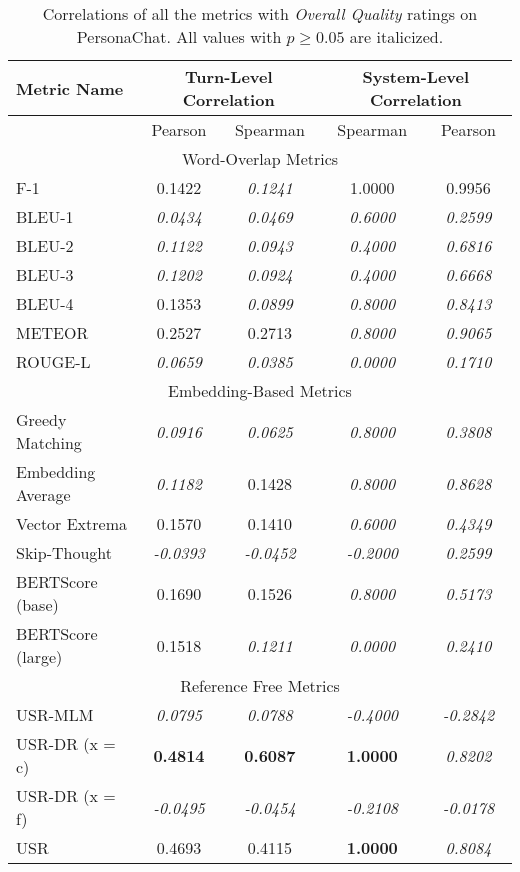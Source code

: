 \documentclass[11pt,a4paper]{article}
\begin{document}
\begin{table*}
    \centering
    \renewcommand*{\arraystretch}{1.2}
    \begin{tabular}{|l|c|c|c|c|}
    \hline
        \textbf{Metric Name} & \multicolumn{2}{|c|}{\textbf{Turn-Level Correlation}} & \multicolumn{2}{|c|}{\textbf{System-Level Correlation}}  \\ \hline
         & Pearson & Spearman & Spearman & Pearson \\ \hline
         \multicolumn{5}{|c|}{Word-Overlap Metrics} \\ \hline
F-1 & 0.1422 & \textit{0.1241} & 1.0000 & 0.9956 \\
BLEU-1 & \textit{0.0434} & \textit{0.0469} & \textit{0.6000} & \textit{0.2599} \\
BLEU-2 & \textit{0.1122} & \textit{0.0943} & \textit{0.4000} & \textit{0.6816} \\
BLEU-3 & \textit{0.1202} & \textit{0.0924} & \textit{0.4000} & \textit{0.6668} \\
BLEU-4 & 0.1353 & \textit{0.0899} & \textit{0.8000} & \textit{0.8413} \\
METEOR & 0.2527 & 0.2713 & \textit{0.8000} & \textit{0.9065} \\
ROUGE-L & \textit{0.0659} & \textit{0.0385} & \textit{0.0000} & \textit{0.1710} \\\hline 
 \multicolumn{5}{|c|}{Embedding-Based Metrics} \\ \hline
Greedy Matching & \textit{0.0916} & \textit{0.0625} & \textit{0.8000} & \textit{0.3808} \\
Embedding Average & \textit{0.1182} & 0.1428 & \textit{0.8000} & \textit{0.8628} \\
Vector Extrema & 0.1570 & 0.1410 & \textit{0.6000} & \textit{0.4349} \\
Skip-Thought & \textit{-0.0393} & \textit{-0.0452} & \textit{-0.2000} & \textit{0.2599} \\
BERTScore (base) & 0.1690 & 0.1526 & \textit{0.8000} & \textit{0.5173} \\
BERTScore (large) & 0.1518 & \textit{0.1211} & \textit{0.0000} & \textit{0.2410} \\\hline 
 \multicolumn{5}{|c|}{Reference Free Metrics} \\ \hline
USR-MLM & \textit{0.0795} & \textit{0.0788} & \textit{-0.4000} & \textit{-0.2842} \\
USR-DR (x = c) & \textbf{0.4814} & \textbf{0.6087} & \textbf{1.0000} & \textit{0.8202} \\
USR-DR (x = f) & \textit{-0.0495} & \textit{-0.0454} & \textit{-0.2108} & \textit{-0.0178} \\
USR & 0.4693 & 0.4115 & \textbf{1.0000} & \textit{0.8084} \\\hline
    \end{tabular}
    \caption{Correlations of all the metrics with \textit{Overall Quality} ratings on PersonaChat. All values with $p \geq 0.05$ are italicized.}
    
\end{table*}
\end{document}
